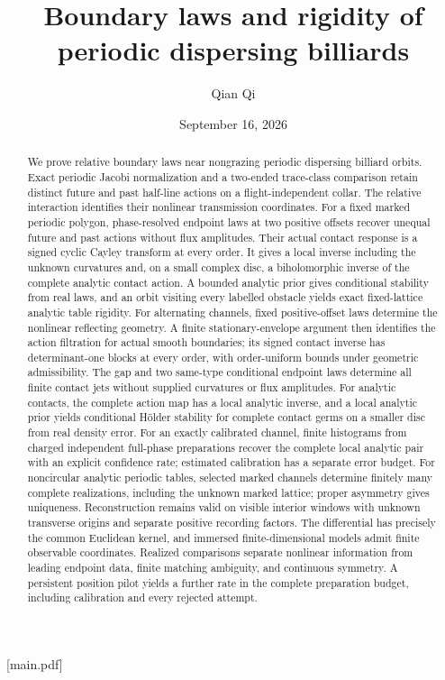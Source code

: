 
[main.pdf]
\title[Boundary laws and periodic rigidity]{Boundary laws and rigidity of periodic dispersing billiards}
\author{Qian Qi}
\date{September 16, 2026}


\begin{abstract}
We prove relative boundary laws near nongrazing periodic dispersing
billiard orbits.  Exact periodic Jacobi normalization and a two-ended
trace-class comparison retain distinct future and past half-line actions
on a flight-independent collar.  The relative interaction identifies their
nonlinear transmission coordinates.  For a fixed marked periodic polygon, phase-resolved endpoint laws at two
positive offsets recover unequal future and past actions without flux
amplitudes.  Their actual contact response is a signed cyclic Cayley
transform at every order.  It gives a local inverse including the unknown
curvatures and, on a small complex disc, a biholomorphic inverse of the
complete analytic contact action.  A bounded analytic prior gives
conditional stability from real laws, and an orbit visiting every
labelled obstacle yields exact fixed-lattice analytic table rigidity.
For alternating channels, fixed
positive-offset laws determine the nonlinear reflecting geometry.
A finite stationary-envelope argument then identifies the action filtration
for actual smooth boundaries; its signed contact inverse has determinant-one
blocks at every order, with order-uniform bounds under geometric
admissibility.  The gap and two same-type conditional endpoint laws determine
all finite contact jets without supplied curvatures or flux amplitudes.
For analytic contacts, the complete action map has a local analytic inverse,
and a local analytic prior yields conditional H\"older stability for complete
contact germs on a smaller disc from real density error.
For an exactly calibrated channel, finite histograms from charged independent
full-phase preparations recover the complete local analytic pair with an
explicit confidence rate; estimated calibration has a separate error budget.
For noncircular analytic periodic tables, selected marked channels determine
finitely many complete realizations, including the unknown marked lattice;
proper asymmetry gives uniqueness.  Reconstruction remains valid on visible
interior windows with unknown transverse origins and separate positive
recording factors.  The differential has precisely the common Euclidean
kernel, and immersed finite-dimensional models admit finite observable
coordinates.  Realized comparisons separate nonlinear information from
leading endpoint data, finite matching ambiguity, and continuous symmetry.
A persistent position pilot yields a further rate in the complete
preparation budget, including calibration and every rejected attempt.
\end{abstract}
